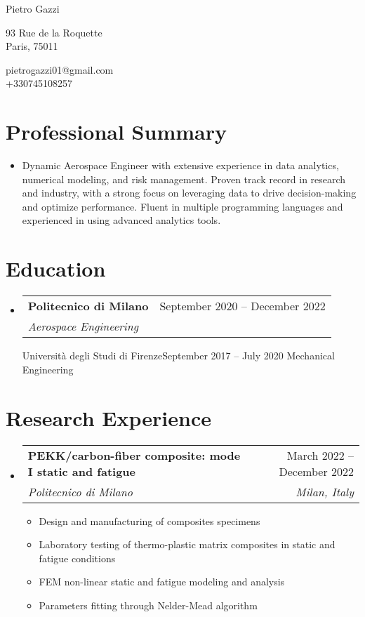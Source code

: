 \documentclass[letterpaper,11pt]{article}
\makeatletter
\newcommand{\resumeItem}[1]{
  \item{
    {#1 \vspace{-4pt}}
  }
}
\newcommand{\resumeSubheading}[4]{
  \vspace{-2pt}\item
    \begin{tabular*}{0.97\textwidth}[t]{l@{\extracolsep{\fill}}r}
      \textbf{#1} & #2 \\
      \textit{\small #3} & \textit{\small #4} \\
    \end{tabular*}\vspace{-10pt}
}
\newcommand{\resumeSubHeadingListStart}{\begin{itemize}[leftmargin=0.15in, label={}]}
\newcommand{\resumeSubHeadingListEnd}{\end{itemize}}
\newcommand{\resumeItemListStart}{\begin{itemize}}
\newcommand{\resumeItemListEnd}{\end{itemize}\vspace{-2pt}}
\makeatother
\begin{document}
\begin{center}
    {\LARGE Pietro Gazzi} \\ \vspace{0pt} 
    \begin{multicols}{2}
    \begin{flushleft}
    \large{93 Rue de la Roquette} \\
    \large{Paris, 75011 } \\
    \end{flushleft}
    
    \begin{flushright}
    \href{mailto:{pietrogazzi01@gmail.com}} \large{pietrogazzi01@gmail.com}\\
    \large{+330745108257}
    \end{flushright}
    \end{multicols}
\end{center}

\section{Professional Summary}
\resumeSubHeadingListStart
\item{
    Dynamic Aerospace Engineer with extensive experience in data analytics, numerical modeling, and risk management. Proven track record in research and industry, with a strong focus on leveraging data to drive decision-making and optimize performance. Fluent in multiple programming languages and experienced in using advanced analytics tools.
}
\resumeSubHeadingListEnd

\section{Education}
\resumeSubHeadingListStart
    \resumeSubheading
        {Politecnico di Milano}{September 2020 -- December 2022}
        {Aerospace Engineering}
    \resumeSubheading
        {Università degli Studi di Firenze}{September 2017 -- July 2020}
        {Mechanical Engineering}
\resumeSubHeadingListEnd

\section{Research Experience}
\resumeSubHeadingListStart
    \resumeSubheading
        {PEKK/carbon-fiber composite: mode I static and fatigue}{March 2022 -- December 2022}
        {Politecnico di Milano}{Milan, Italy}
      \resumeItemListStart
        \resumeItem{Design and manufacturing of composites specimens}
        \resumeItem{Laboratory testing of thermo-plastic matrix composites in static and fatigue conditions}
        \resumeItem{FEM non-linear static and fatigue modeling and analysis}
        \resumeItem{Parameters fitting through Nelder-Mead algorithm}
    \resumeItemListEnd
\resumeSubHeadingListEnd
\end{document}
